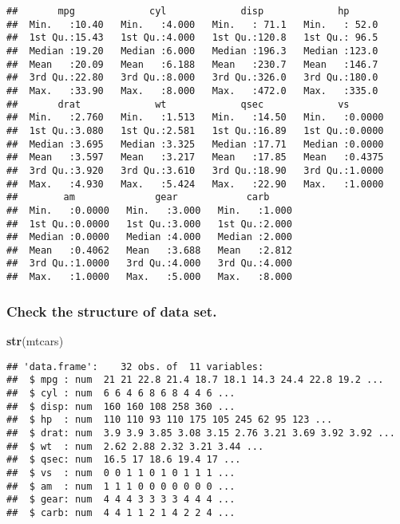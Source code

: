 \documentclass[
]{article}
\newenvironment{Shaded}{\begin{snugshade}}{\end{snugshade}}
\newcommand{\FunctionTok}[1]{\textcolor[rgb]{0.13,0.29,0.53}{\textbf{#1}}}
\newcommand{\NormalTok}[1]{#1}
\begin{document}
\begin{verbatim}
##       mpg             cyl             disp             hp       
##  Min.   :10.40   Min.   :4.000   Min.   : 71.1   Min.   : 52.0  
##  1st Qu.:15.43   1st Qu.:4.000   1st Qu.:120.8   1st Qu.: 96.5  
##  Median :19.20   Median :6.000   Median :196.3   Median :123.0  
##  Mean   :20.09   Mean   :6.188   Mean   :230.7   Mean   :146.7  
##  3rd Qu.:22.80   3rd Qu.:8.000   3rd Qu.:326.0   3rd Qu.:180.0  
##  Max.   :33.90   Max.   :8.000   Max.   :472.0   Max.   :335.0  
##       drat             wt             qsec             vs        
##  Min.   :2.760   Min.   :1.513   Min.   :14.50   Min.   :0.0000  
##  1st Qu.:3.080   1st Qu.:2.581   1st Qu.:16.89   1st Qu.:0.0000  
##  Median :3.695   Median :3.325   Median :17.71   Median :0.0000  
##  Mean   :3.597   Mean   :3.217   Mean   :17.85   Mean   :0.4375  
##  3rd Qu.:3.920   3rd Qu.:3.610   3rd Qu.:18.90   3rd Qu.:1.0000  
##  Max.   :4.930   Max.   :5.424   Max.   :22.90   Max.   :1.0000  
##        am              gear            carb      
##  Min.   :0.0000   Min.   :3.000   Min.   :1.000  
##  1st Qu.:0.0000   1st Qu.:3.000   1st Qu.:2.000  
##  Median :0.0000   Median :4.000   Median :2.000  
##  Mean   :0.4062   Mean   :3.688   Mean   :2.812  
##  3rd Qu.:1.0000   3rd Qu.:4.000   3rd Qu.:4.000  
##  Max.   :1.0000   Max.   :5.000   Max.   :8.000
\end{verbatim}

\hypertarget{check-the-structure-of-data-set.}{%
\subsubsection{Check the structure of data
set.}\label{check-the-structure-of-data-set.}}

\begin{Shaded}
\begin{Highlighting}[]
\FunctionTok{str}\NormalTok{(mtcars)}
\end{Highlighting}
\end{Shaded}

\begin{verbatim}
## 'data.frame':    32 obs. of  11 variables:
##  $ mpg : num  21 21 22.8 21.4 18.7 18.1 14.3 24.4 22.8 19.2 ...
##  $ cyl : num  6 6 4 6 8 6 8 4 4 6 ...
##  $ disp: num  160 160 108 258 360 ...
##  $ hp  : num  110 110 93 110 175 105 245 62 95 123 ...
##  $ drat: num  3.9 3.9 3.85 3.08 3.15 2.76 3.21 3.69 3.92 3.92 ...
##  $ wt  : num  2.62 2.88 2.32 3.21 3.44 ...
##  $ qsec: num  16.5 17 18.6 19.4 17 ...
##  $ vs  : num  0 0 1 1 0 1 0 1 1 1 ...
##  $ am  : num  1 1 1 0 0 0 0 0 0 0 ...
##  $ gear: num  4 4 4 3 3 3 3 4 4 4 ...
##  $ carb: num  4 4 1 1 2 1 4 2 2 4 ...
\end{verbatim}
\end{document}
